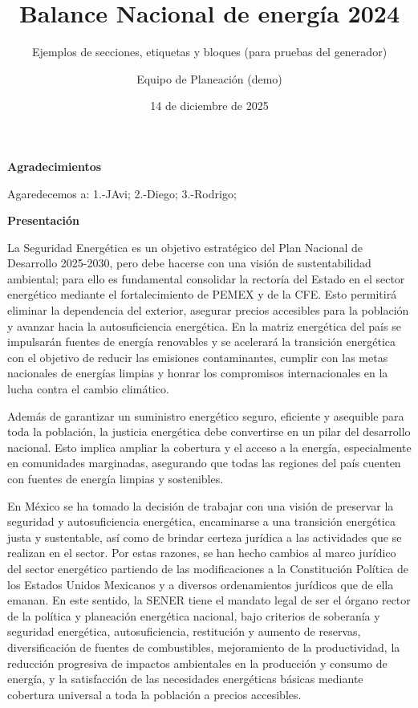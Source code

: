 \documentclass{sener2025}
\title{Balance Nacional de energía 2024}
\subtitle{Ejemplos de secciones, etiquetas y bloques (para pruebas del generador)}
\author{Equipo de Planeación (demo)}
\date{14 de diciembre de 2025}
\begin{document}

\tableofcontents
\newpage

\listafiguras
\newpage

\listatablas
\newpage

\clearpage
\begin{center}
{\Large\patriafont\bfseries\color{gobmxGuinda}Agradecimientos}\\[1cm]
\end{center}

Agaredecemos a:
1.-JAvi;
2.-Diego;
3.-Rodrigo;

\clearpage
\begin{center}
{\Large\patriafont\bfseries\color{gobmxGuinda}Presentación}\\[1cm]
\end{center}

La Seguridad Energética es un objetivo estratégico del Plan Nacional de Desarrollo 2025-2030, pero debe hacerse con una visión de sustentabilidad ambiental; para ello es fundamental consolidar la rectoría del Estado en el sector energético mediante el fortalecimiento de PEMEX y de la CFE. Esto permitirá eliminar la dependencia del exterior, asegurar precios accesibles para la población y avanzar hacia la autosuficiencia energética. En la matriz energética del país se impulsarán fuentes de energía renovables y se acelerará la transición energética con el objetivo de reducir las emisiones contaminantes, cumplir con las metas nacionales de energías limpias y honrar los compromisos internacionales en la lucha contra el cambio climático.

 Además de garantizar un suministro energético seguro, eficiente y asequible para toda la población, la justicia energética debe convertirse en un pilar del desarrollo nacional. Esto implica ampliar la cobertura y el acceso a la energía, especialmente en comunidades marginadas, asegurando que todas las regiones del país cuenten con fuentes de energía limpias y sostenibles.

 En México se ha tomado la decisión de trabajar con una visión de preservar la seguridad y autosuficiencia energética, encaminarse a una transición energética justa y sustentable, así como de brindar certeza jurídica a las actividades que se realizan en el sector. Por estas razones, se han hecho cambios al marco jurídico del sector energético partiendo de las modificaciones a la Constitución Política de los Estados Unidos Mexicanos y a diversos ordenamientos jurídicos que de ella emanan. En este sentido, la SENER tiene el mandato legal de ser el órgano rector de la política y planeación energética nacional, bajo criterios de soberanía y seguridad energética, autosuficiencia, restitución y aumento de reservas, diversificación de fuentes de combustibles, mejoramiento de la productividad, la reducción progresiva de impactos ambientales en la producción y consumo de energía, y la satisfacción de las necesidades energéticas básicas mediante cobertura universal a toda la población a precios accesibles.
\end{document}
